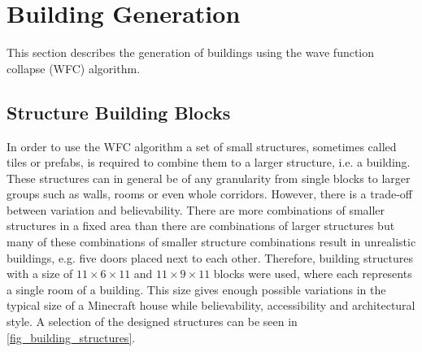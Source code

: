 \documentclass[
oneside,
fontsize=11pt
]{scrartcl}
\begin{document}
\section{Building Generation}
This section describes the generation of buildings using the wave function collapse (WFC) algorithm.

\subsection{Structure Building Blocks}
\label{sec_strucutre_building_blocks}
In order to use the WFC algorithm a set of small structures, sometimes called tiles or prefabs, 
is required to combine them to a larger structure, i.e. a building. 
These structures can in general be of any granularity from single blocks 
to larger groups such as walls, rooms or even whole corridors. 
However, there is a trade-off between variation and believability.
There are more combinations of smaller structures in a fixed area 
than there are combinations of larger structures 
but many of these combinations of smaller structure combinations 
result in unrealistic buildings, e.g. five doors placed next to each other. 
Therefore, building structures with a size of 
$11 \times 6 \times 11$ and $11 \times 9 \times 11$  blocks 
were used, where each represents a single room of a building.  
This size gives enough possible variations in the typical size of a Minecraft house 
while believability, accessibility and architectural style. 
A selection of the designed structures can be seen in \autoref{fig_building_structures}.
\end{document}
